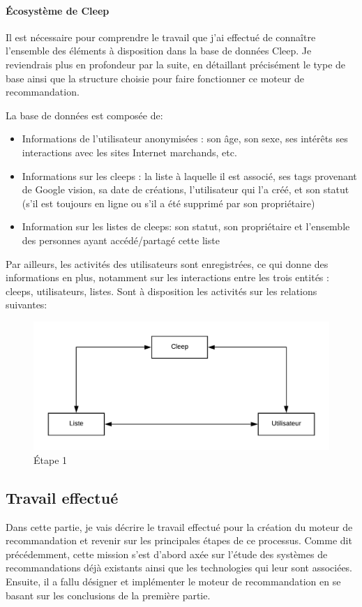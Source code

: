 \documentclass{article} %
\begin{document}
\paragraph{Écosystème de Cleep\\}
Il est nécessaire pour comprendre le travail que j'ai effectué de connaître l'ensemble des éléments à disposition dans la base de données Cleep. Je reviendrais plus en profondeur par la suite, en détaillant précisément le type de base ainsi que la structure choisie pour faire fonctionner ce moteur de recommandation.\\
\newpage

La base de données est composée de:
\begin{itemize}
 \item Informations de l'utilisateur anonymisées : son âge, son sexe, ses intérêts ses interactions avec les sites Internet marchands, etc.
 \item Informations sur les cleeps : la liste à laquelle il est associé, ses tags provenant de Google vision, sa date de créations, l'utilisateur qui l'a créé, et son statut (s'il est toujours en ligne ou s'il a été supprimé par son propriétaire)
 \item Information sur les listes de cleeps: son statut, son propriétaire et l'ensemble des personnes ayant accédé/partagé cette liste
\end{itemize}
Par ailleurs, les activités des utilisateurs sont enregistrées, ce qui donne des informations en plus, notamment sur les interactions entre les trois entités : cleeps, utilisateurs, listes. Sont à disposition les activités sur les relations suivantes:
\begin{figure}[!h]
 \centering
 \includegraphics[keepaspectratio = true,scale=1]{relations.png}
 \caption{Étape 1}
 \label{fig:rel}
\end{figure}



\subsection{Travail effectué}
Dans cette partie, je vais décrire le travail effectué pour la création du moteur de recommandation et revenir sur les principales étapes de ce processus. Comme dit précédemment, cette mission s'est d'abord axée sur l'étude des systèmes de recommandations déjà existants ainsi que les technologies qui leur sont associées. Ensuite, il a fallu désigner et implémenter le moteur de recommandation en se basant sur les conclusions de la première partie. 
\end{document}
